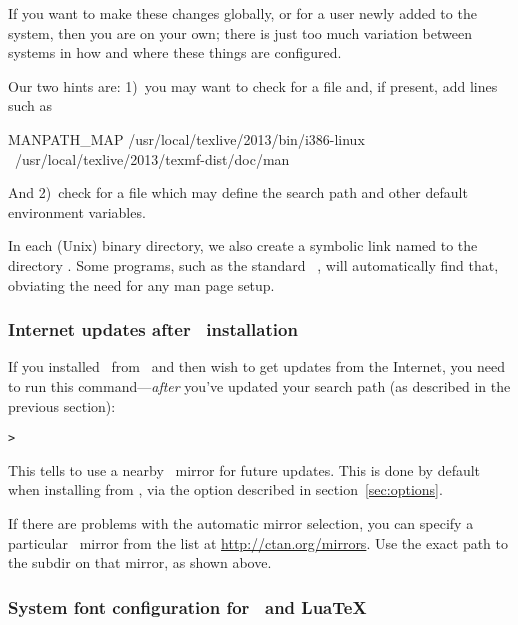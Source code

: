 \documentclass{article}
\begin{document}
If you want to make these changes globally, or for a user newly added to
the system, then you are on your own; there is just too much variation
between systems in how and where these things are configured.

Our two hints are: 1)~you may want to check for a file
 and, if present, add lines such as

\begin{sverbatim}
MANPATH_MAP /usr/local/texlive/2013/bin/i386-linux \
            /usr/local/texlive/2013/texmf-dist/doc/man
\end{sverbatim}

And 2)~check for a file  which may define the
search path and other default environment variables.

In each (Unix) binary directory, we also create a symbolic link named
 to the directory \dirname{texmf-dist/doc/man}.  Some 
programs, such as the standard \MacOSX\ \code{man}, will automatically
find that, obviating the need for any man page setup.


\subsubsection{Internet updates after \DVD\ installation}
\label{sec:dvd-install-net-updates}

If you installed \TL\ from \DVD\ and then wish to get updates from the
Internet, you need to run this command---\emph{after} you've updated
your search path (as described in the previous section):

\begin{alltt}
> 
\end{alltt}

This tells  to use a nearby \CTAN\ mirror for future updates.
This is done by default when installing from \DVD, via the option
described in section~\ref{sec:options}.

If there are problems with the automatic mirror selection, you can
specify a particular \CTAN\ mirror from the list at
\url{http://ctan.org/mirrors}.  Use the exact path to the
 subdir on that mirror, as shown above.


\subsubsection{System font configuration for \XeTeX\ and Lua\TeX}
\label{sec:font-conf-sys}
\end{document}
